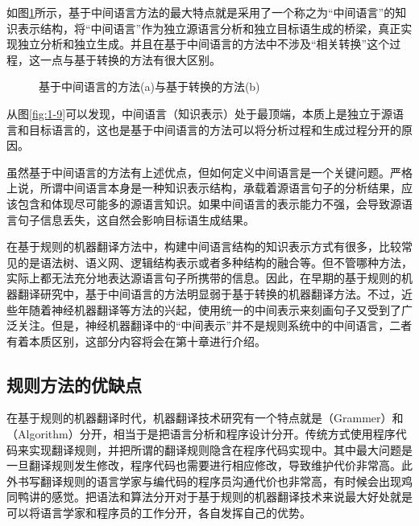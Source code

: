 \parinterval 如图\ref{fig:1-12}所示，基于中间语言方法的最大特点就是采用了一个称之为“中间语言”的知识表示结构，将“中间语言”作为独立源语言分析和独立目标语生成的桥梁，真正实现独立分析和独立生成。并且在基于中间语言的方法中不涉及“相关转换”这个过程，这一点与基于转换的方法有很大区别。

\begin{figure}[htp]
    \centering

    \caption{基于中间语言的方法(a)与基于转换的方法(b)}
    \label{fig:1-12}
\end{figure}

\parinterval 从图\ref{fig:1-9}可以发现，中间语言（知识表示）处于最顶端，本质上是独立于源语言和目标语言的，这也是基于中间语言的方法可以将分析过程和生成过程分开的原因。

\parinterval 虽然基于中间语言的方法有上述优点，但如何定义中间语言是一个关键问题。严格上说，所谓中间语言本身是一种知识表示结构，承载着源语言句子的分析结果，应该包含和体现尽可能多的源语言知识。如果中间语言的表示能力不强，会导致源语言句子信息丢失，这自然会影响目标语生成结果。

\parinterval 在基于规则的机器翻译方法中，构建中间语言结构的知识表示方式有很多，比较常见的是语法树、语义网、逻辑结构表示或者多种结构的融合等。但不管哪种方法，实际上都无法充分地表达源语言句子所携带的信息。因此，在早期的基于规则的机器翻译研究中，基于中间语言的方法明显弱于基于转换的机器翻译方法。不过，近些年随着神经机器翻译等方法的兴起，使用统一的中间表示来刻画句子又受到了广泛关注。但是，神经机器翻译中的“中间表示”并不是规则系统中的中间语言，二者有着本质区别，这部分内容将会在第十章进行介绍。


\subsection{规则方法的优缺点}

\parinterval 在基于规则的机器翻译时代，机器翻译技术研究有一个特点就是{\small{}}（Grammer）和{\small{}}（Algorithm）分开，相当于是把语言分析和程序设计分开。传统方式使用程序代码来实现翻译规则，并把所谓的翻译规则隐含在程序代码实现中。其中最大问题是一旦翻译规则发生修改，程序代码也需要进行相应修改，导致维护代价非常高。此外书写翻译规则的语言学家与编代码的程序员沟通代价也非常高，有时候会出现鸡同鸭讲的感觉。把语法和算法分开对于基于规则的机器翻译技术来说最大好处就是可以将语言学家和程序员的工作分开，各自发挥自己的优势。


